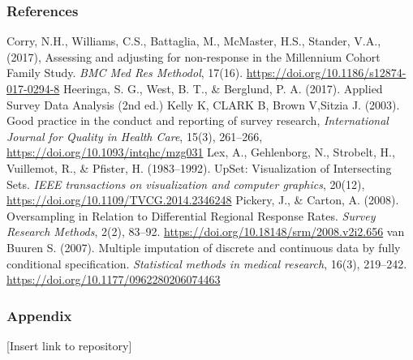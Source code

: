 \documentclass[
  12pt,
]{article}
\begin{document}
\hypertarget{references}{%
\subsubsection{References}\label{references}}

Corry, N.H., Williams, C.S., Battaglia, M., McMaster, H.S., Stander,
V.A., (2017), Assessing and adjusting for non-response in the Millennium
Cohort Family Study. \emph{BMC Med Res Methodol}, 17(16).
\url{https://doi.org/10.1186/s12874-017-0294-8} \newline Heeringa, S.
G., West, B. T., \& Berglund, P. A. (2017). Applied Survey Data Analysis
(2nd ed.) \newline Kelly K, CLARK B, Brown V,Sitzia J. (2003). Good
practice in the conduct and reporting of survey research,
\emph{International Journal for Quality in Health Care}, 15(3),
261--266, \url{https://doi.org/10.1093/intqhc/mzg031} \newline Lex, A.,
Gehlenborg, N., Strobelt, H., Vuillemot, R., \& Pfister, H.
(1983--1992). UpSet: Visualization of Intersecting Sets. \emph{IEEE
transactions on visualization and computer graphics}, 20(12),
\url{https://doi.org/10.1109/TVCG.2014.2346248} \newline Pickery, J., \&
Carton, A. (2008). Oversampling in Relation to Differential Regional
Response Rates. \emph{Survey Research Methods}, 2(2), 83--92.
\url{https://doi.org/10.18148/srm/2008.v2i2.656} \newline van Buuren S.
(2007). Multiple imputation of discrete and continuous data by fully
conditional specification. \emph{Statistical methods in medical
research}, 16(3), 219--242.
\url{https://doi.org/10.1177/0962280206074463}

\hypertarget{appendix}{%
\subsubsection{Appendix}\label{appendix}}

{[}Insert link to repository{]}
\end{document}
